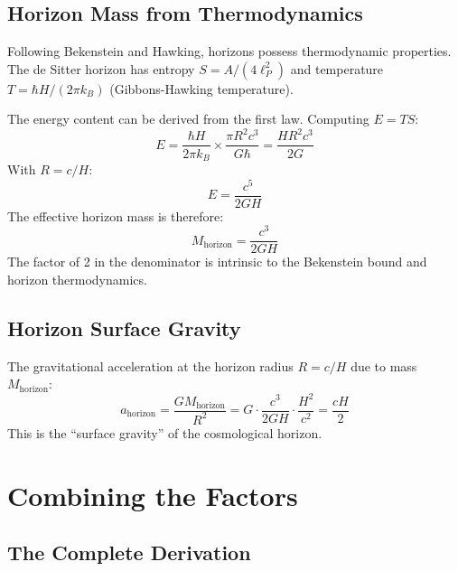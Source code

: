 \documentclass[twocolumn,showpacs,preprintnumbers,amsmath,amssymb,prd]{revtex4-2}
\begin{document}
\subsection{Horizon Mass from Thermodynamics}

Following Bekenstein and Hawking, horizons possess thermodynamic properties. The de Sitter horizon has entropy $S = A/(4\ell_P^2)$ and temperature $T = \hbar H/(2\pi k_B)$ (Gibbons-Hawking temperature).

The energy content can be derived from the first law. Computing $E = TS$:
\begin{equation}
E = \frac{\hbar H}{2\pi k_B} \times \frac{\pi R^2 c^3}{G\hbar} = \frac{H R^2 c^3}{2G}
\end{equation}
With $R = c/H$:
\begin{equation}
E = \frac{c^5}{2GH}
\end{equation}
The effective horizon mass is therefore:
\begin{equation}
M_{\text{horizon}} = \frac{c^3}{2GH}
\label{eq:Mhorizon}
\end{equation}
The factor of 2 in the denominator is intrinsic to the Bekenstein bound and horizon thermodynamics.

\subsection{Horizon Surface Gravity}

The gravitational acceleration at the horizon radius $R = c/H$ due to mass $M_{\text{horizon}}$:
\begin{equation}
a_{\text{horizon}} = \frac{GM_{\text{horizon}}}{R^2} = G \cdot \frac{c^3}{2GH} \cdot \frac{H^2}{c^2} = \frac{cH}{2}
\label{eq:ahorizon}
\end{equation}
This is the ``surface gravity'' of the cosmological horizon.

\section{Combining the Factors}

\subsection{The Complete Derivation}
\end{document}
